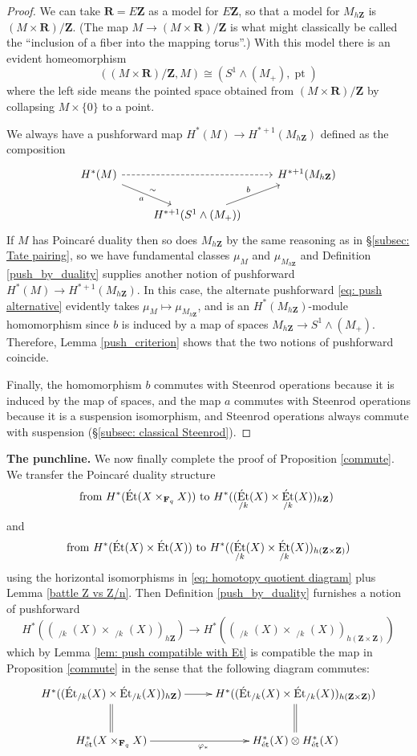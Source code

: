 \documentclass[10pt, reqno]{amsart}
\numberwithin{equation}{subsection}
\newcommand{\F}{\mathbf{F}}
\newcommand{\Z}{\mathbf{Z}}
\newcommand{\R}{\mathbf{R}}
\DeclareMathOperator{\et}{\acute{e}t}
\DeclareMathOperator{\pt}{pt}
\DeclareMathOperator{\Et}{\acute{E}t}
\theoremstyle{remark}
\begin{document}
\begin{proof}
We can take $\R = E\Z$ as a model for $E\Z$, so that a model for $M_{h\Z}$ is $(M \times \R) /\Z$. (The map $M \rightarrow (M \times \R) /\Z$ is what might classically be called the ``inclusion of a fiber into the mapping torus''.) With this model there is an evident homeomorphism
\[
((M \times \R )/\Z,  M) \cong (S^1 \wedge (M_+) , \pt)
\]
where the left side means the pointed space obtained from $(M \times \R )/\Z$ by collapsing $M\times \{0\}$ to a point. 

We always have a pushforward map $H^*(M) \rightarrow H^{*+1}(M_{h\Z})$ defined as the composition
\begin{equation}\label{eq: push alternative}
\begin{tikzcd}
H^*(M) \ar[rr, dashed] \ar[dr, "a"', "\sim"]  & & H^{*+1}(M_{h\Z}) \\
& H^{*+1}(S^1 \wedge (M_+)) \ar[ur, "b"]
\end{tikzcd}
\end{equation}
If $M$ has Poincar\'{e} duality then so does $M_{h\Z}$ by the same reasoning as in \S \ref{subsec: Tate pairing}, so we have fundamental classes $\mu_M$ and $\mu_{M_{h\Z}}$ and Definition \ref{push_by_duality} supplies another notion of pushforward $H^*(M) \rightarrow H^{*+1}(M_{h\Z})$. In this case, the alternate pushforward \eqref{eq: push alternative} evidently takes $\mu_M \mapsto \mu_{M_{h\Z}}$, and is an $H^{*}(M_{h\Z})$-module homomorphism since $b$ is induced by a map of spaces $M_{h\Z} \rightarrow S^1 \wedge (M_+)$. Therefore, Lemma \ref{push_criterion} shows that the two notions of pushforward coincide.	

Finally, the homomorphism $b$ commutes with Steenrod operations because it is induced by the map of spaces, and the map $a$ commutes with Steenrod operations because it is a suspension isomorphism, and Steenrod operations always commute with suspension (\S \ref{subsec: classical Steenrod}).
\end{proof}

\noindent \textbf{The punchline.} We now finally complete the proof of Proposition \ref{commute}. We transfer the Poincar\'{e} duality structure 
\[
\text{from $H^*(\Et(X \times_{\F_q} X))$ to $ H^*((\Et_{/k}(X) \times \Et_{/k}(X))_{h\Z})$ }
\]
and 
\[
\text{from $H^*(  \Et(X) \times \Et(X))$ to $ H^*((\Et_{/k}(X) \times \Et_{/k}(X))_{h(\Z  \times \Z)})$}
\]
using the horizontal isomorphisms in \eqref{eq: homotopy quotient diagram} plus Lemma \ref{battle Z vs Z/n}. Then Definition \ref{push_by_duality} furnishes a notion of pushforward 
\begin{equation}\label{battle eq 7}
H^*((\Et_{/k}(X) \times \Et_{/k}(X))_{h\Z}) \rightarrow   H^*((\Et_{/k}(X) \times \Et_{/k}(X))_{h(\Z  \times \Z)})
\end{equation}
which by Lemma \ref{lem: push compatible with Et} is compatible the map in Proposition \ref{commute} in the sense that the following diagram commutes:
\[
\xymatrix{
H^*((\Et_{/k}(X) \times \Et_{/k}(X))_{h\Z})\ar[r] \ar@{=}[d]  &  H^*((\Et_{/k}(X) \times \Et_{/k}(X))_{h(\Z  \times \Z)})\ar@{=}[d]\\
H_{\et}^*(X \times_{\F_q} X) \ar[r]_{\varphi_*} & H^*_{\et}(X) \otimes H^*_{\et}(X)
}
\]
\end{document}
